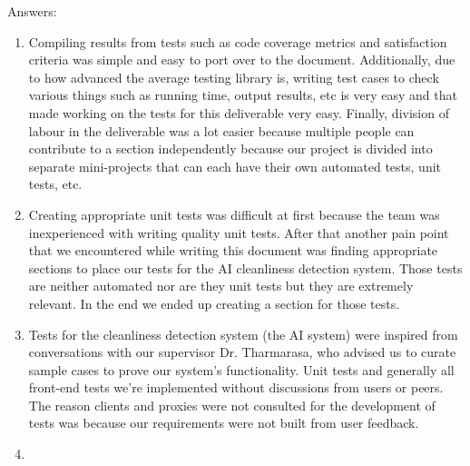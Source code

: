 \documentclass[12pt, titlepage]{article}
\begin{document}
Answers:
\begin{enumerate}
  \item Compiling results from tests such as code coverage metrics and satisfaction criteria was simple and easy to port over to the document. Additionally, due to how advanced the average testing library is, writing test cases to check various things such as running time, output results, etc is very easy and that made working on the tests for this deliverable very easy. Finally, division of labour in the deliverable was a lot easier because multiple people can contribute to a section independently because our project is divided into separate mini-projects that can each have their own automated tests, unit tests, etc.
  \item Creating appropriate unit tests was difficult at first because the team was inexperienced with writing quality unit tests. After that another pain point that we encountered while writing this document was finding appropriate sections to place our tests for the AI cleanliness detection system. Those tests are neither automated nor are they unit tests but they are extremely relevant. In the end we ended up creating a section for those tests.
  \item Tests for the cleanliness detection system (the AI system) were inspired from conversations with our supervisor Dr. Tharmarasa, who advised us to curate sample cases to prove our system's functionality. Unit tests and generally all front-end tests we're implemented without discussions from users or peers. The reason clients and proxies were not consulted for the development of tests was because our requirements were not built from user feedback.
  \item 
\end{enumerate}
\end{document}
